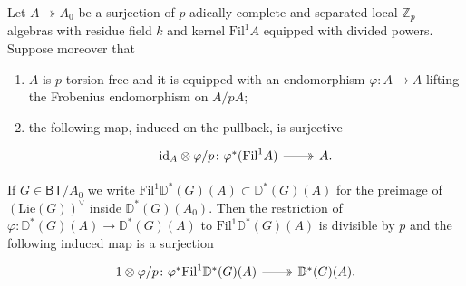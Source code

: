 \begin{lem}\label{lem:A2Kisin}
	Let $A \twoheadrightarrow A_0$ be a surjection of $p$-adically complete
	and separated local $\mathbb{Z}_{p}$-algebras with residue field
	$k$ and kernel $\mathrm{Fil}^1 A$ equipped with divided powers.
	Suppose moreover that
\begin{enumerate}
	\item $A$ is $p$-torsion-free and it is equipped with an endomorphism
		$\varphi\colon A \to A$ lifting the Frobenius endomorphism on $A/pA$;
		
	\item the following map, induced on the pullback, is surjective
		\begin{equation*}
		\begin{tikzcd}
			\mathrm{id}_{ A } \otimes \varphi/p \colon
			\varphi^*(\mathrm{Fil}^1 A)
			\arrow[r, "", twoheadrightarrow] &
			A
		.\end{tikzcd}
		\end{equation*}
\end{enumerate}
	If $G \in \mathsf{BT}/A_0$ we write $\mathrm{Fil}^1 \mathbb{D}^*(G)(A) \subset \mathbb{D}^*(G)(A)$
	for the preimage of $\left( \mathrm{Lie}(G) \right)^\vee$ inside $\mathbb{D}^*(G)(A_0)$.
	Then the restriction of $\varphi\colon \mathbb{D}^*(G)(A) \to \mathbb{D}^*(G)(A)$
	to $\mathrm{Fil}^1 \mathbb{D}^*(G)(A)$ is divisible by $p$ and the following induced map
	is a surjection
	\begin{equation*}
	\begin{tikzcd}
		1 \otimes \varphi/p \colon
		\varphi^*\mathrm{Fil}^1 \mathbb{D}^*(G)(A)
		\arrow[r, "", twoheadrightarrow] &
		\mathbb{D}^*(G)(A)
	.\end{tikzcd}
	\end{equation*}
\end{lem} 

